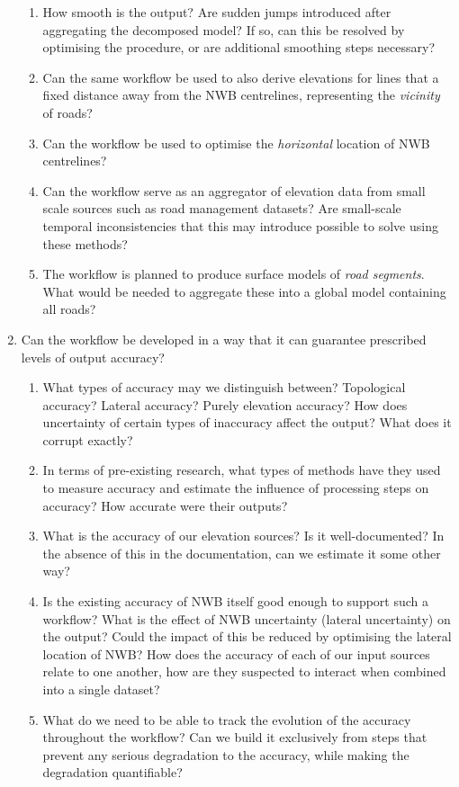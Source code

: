 \begin{enumerate}
\begin{enumerate}
        \item How smooth is the output? Are sudden jumps introduced after aggregating the decomposed model? If so, can this be resolved by optimising the procedure, or are additional smoothing steps necessary?
        \item Can the same workflow be used to also derive elevations for lines that a fixed distance away from the NWB centrelines, representing the \textit{vicinity} of roads?
        \item Can the workflow be used to optimise the \textit{horizontal} location of NWB centrelines?
        \item Can the workflow serve as an aggregator of elevation data from small scale sources such as road management datasets? Are small-scale temporal inconsistencies that this may introduce possible to solve using these methods?
        \item The workflow is planned to produce surface models of \textit{road segments}. What would be needed to aggregate these into a global model containing all roads?
    \end{enumerate}
    \item Can the workflow be developed in a way that it can guarantee prescribed levels of output accuracy?
    \begin{enumerate}
        \item What types of accuracy may we distinguish between? Topological accuracy? Lateral accuracy? Purely elevation accuracy? How does uncertainty of certain types of inaccuracy affect the output? What does it corrupt exactly?
        \item In terms of pre-existing research, what types of methods have they used to measure accuracy and estimate the influence of processing steps on accuracy? How accurate were their outputs?
        \item What is the accuracy of our elevation sources? Is it well-documented? In the absence of this in the documentation, can we estimate it some other way?
        \item Is the existing accuracy of NWB itself good enough to support such a workflow? What is the effect of NWB uncertainty (lateral uncertainty) on the output? Could the impact of this be reduced by optimising the lateral location of NWB?
        \tiem How does the accuracy of each of our input sources relate to one another, how are they suspected to interact when combined into a single dataset?
        \item What do we need to be able to track the evolution of the accuracy throughout the workflow? Can we build it exclusively from steps that prevent any serious degradation to the accuracy, while making the degradation quantifiable?

\end{enumerate}
\end{enumerate}
